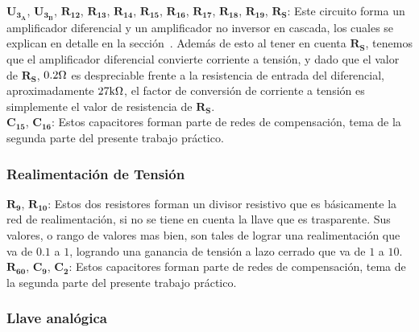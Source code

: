 $\bm{U_{3_{A}}}$, $\bm{U_{3_{B}}}$, $\bm{R_{12}}$, $\bm{R_{13}}$, $\bm{R_{14}}$, $\bm{R_{15}}$, $\bm{R_{16}}$, $\bm{R_{17}}$, $\bm{R_{18}}$, $\bm{R_{19}}$, $\bm{R_{S}}$: Este circuito forma un amplificador diferencial y un amplificador no inversor en cascada, los cuales se explican en detalle en  la sección~. Además de esto al tener en cuenta $\bm{R_{S}}$, tenemos que el amplificador diferencial convierte corriente a tensión, y dado que el valor de $\bm{R_{S}}$, $0.2 \si[per-mode=symbol]{\ohm}$ es despreciable frente a la resistencia de entrada del diferencial, aproximadamente $27 \si[per-mode=symbol]{\kilo\ohm}$, el factor de conversión de corriente a tensión es simplemente el valor de resistencia de $\bm{R_{S}}$.\\

$\bm{C_{15}}$, $\bm{C_{16}}$: Estos capacitores forman parte de redes de compensación, tema de la segunda parte del presente trabajo práctico.\\

\subsubsection{Realimentación de Tensión}

$\bm{R_{9}}$, $\bm{R_{10}}$: Estos dos resistores forman un divisor resistivo que es básicamente la red de realimentación, si no se tiene en cuenta la llave que es trasparente. Sus valores, o rango de valores mas bien, son tales de lograr una realimentación que va de $0.1$ a $1$, logrando una ganancia de tensión a lazo cerrado que va de $1$ a $10$.\\

$\bm{R_{60}}$, $\bm{C_{9}}$, $\bm{C_{2}}$: Estos capacitores forman parte de redes de compensación, tema de la segunda parte del presente trabajo práctico.\\


\subsubsection{Llave analógica}

